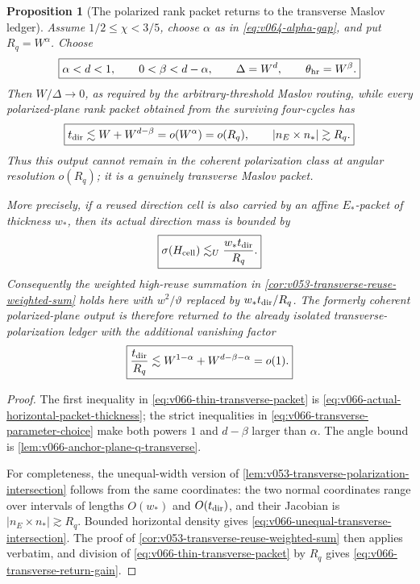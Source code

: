 \documentclass[10pt]{article}
\newtheorem{proposition}[theorem]{Proposition}
\begin{document}
\begin{proposition}[The polarized rank packet returns to the transverse Maslov ledger]
\label{prop:v066-rank-packet-transverse-return}
Assume \(1/2\le\chi<3/5\), choose \(\alpha\) as in
\eqref{eq:v064-alpha-gap}, and put \(R_q=W^\alpha\).  Choose
\begin{equation}
\label{eq:v066-transverse-parameter-choice}
\boxed{
\alpha<d<1,\qquad
0<\beta<d-\alpha,\qquad
\Delta=W^d,\qquad
\theta_{\rm hr}=W^\beta.
}
\end{equation}
Then \(W/\Delta\to0\), as required by the arbitrary-threshold Maslov routing, while every
polarized-plane rank packet obtained from the surviving four-cycles has
\begin{equation}
\label{eq:v066-thin-transverse-packet}
\boxed{
t_{\rm dir}
\lesssim
W+W^{d-\beta}
=o(W^\alpha)=o(R_q),
\qquad
|n_E\times n_*|\gtrsim R_q.
}
\end{equation}
Thus this output cannot remain in the coherent polarization class at angular resolution
\(o(R_q)\); it is a genuinely transverse Maslov packet.

More precisely, if a reused direction cell is also carried by an affine \(E_*\)-packet of
thickness \(w_*\), then its actual direction mass is bounded by
\begin{equation}
\label{eq:v066-unequal-transverse-intersection}
\boxed{
\sigma(H_{\rm cell})
\lesssim_U
\frac{w_*t_{\rm dir}}{R_q}.
}
\end{equation}
Consequently the weighted high-reuse summation in
\cref{cor:v053-transverse-reuse-weighted-sum} holds here with
\(w^2/\vartheta\) replaced by \(w_*t_{\rm dir}/R_q\).  The formerly coherent
polarized-plane output is therefore returned to the already isolated transverse-polarization
ledger with the additional vanishing factor
\begin{equation}
\label{eq:v066-transverse-return-gain}
\boxed{
\frac{t_{\rm dir}}{R_q}
\lesssim
W^{1-\alpha}+W^{d-\beta-\alpha}
=o(1).
}
\end{equation}
\end{proposition}

\begin{proof}
The first inequality in \eqref{eq:v066-thin-transverse-packet} is
\eqref{eq:v066-actual-horizontal-packet-thickness}; the strict inequalities in
\eqref{eq:v066-transverse-parameter-choice} make both powers \(1\) and \(d-\beta\) larger than
\(\alpha\).  The angle bound is
\cref{lem:v066-anchor-plane-q-transverse}.

For completeness, the unequal-width version of
\cref{lem:v053-transverse-polarization-intersection} follows from the same coordinates:
the two normal coordinates range over intervals of lengths \(O(w_*)\) and \(O(t_{\rm dir})\), and
their Jacobian is \(|n_E\times n_*|\gtrsim R_q\).  Bounded horizontal density gives
\eqref{eq:v066-unequal-transverse-intersection}.  The proof of
\cref{cor:v053-transverse-reuse-weighted-sum} then applies verbatim, and division of
\eqref{eq:v066-thin-transverse-packet} by \(R_q\) gives
\eqref{eq:v066-transverse-return-gain}.
\end{proof}
\end{document}
